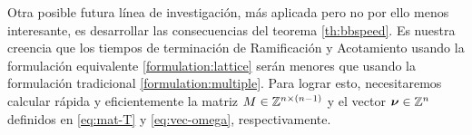 Otra posible futura línea de investigación, más aplicada pero no por ello menos interesante, es
desarrollar las consecuencias del teorema \ref{th:bbspeed}. Es nuestra creencia que los
tiempos de terminación de Ramificación y Acotamiento usando la formulación equivalente
\eqref{formulation:lattice} serán menores que usando la formulación tradicional
\eqref{formulation:multiple}. Para lograr esto, necesitaremos calcular rápida y eficientemente la
matriz $M \in \mathbb{Z}^{n \times (n - 1)}$ y el vector $\boldsymbol{\nu} \in \mathbb{Z}^n$ definidos en \eqref{eq:mat-T}
y \eqref{eq:vec-omega}, respectivamente.
